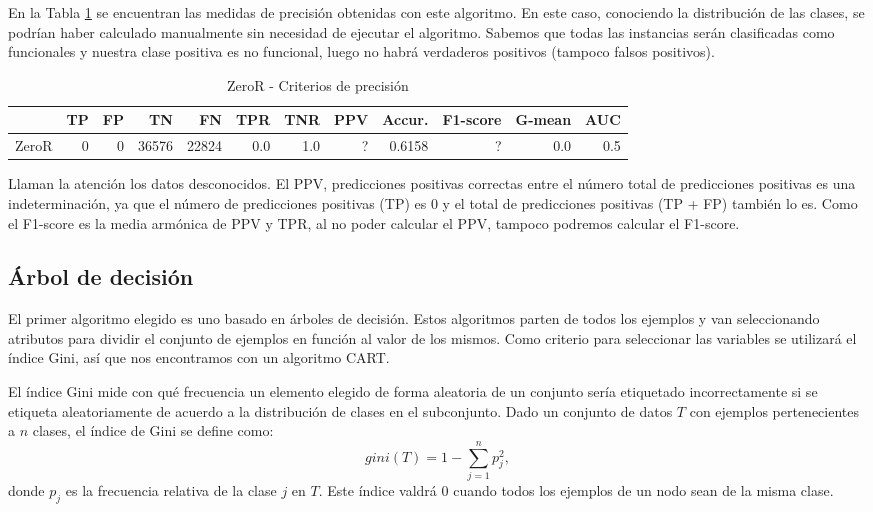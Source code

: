 \documentclass[a4paper, 20pt]{article}
\begin{document}
En la Tabla \ref{tab:zeroR} se encuentran las medidas de precisión obtenidas con este algoritmo. En este caso, conociendo la distribución de las clases, se podrían haber calculado manualmente sin necesidad de ejecutar el algoritmo. Sabemos que todas las instancias serán clasificadas como funcionales y nuestra clase positiva es no funcional, luego no habrá verdaderos positivos (tampoco falsos positivos).

\begin{table}[H]
\centering
\caption{ZeroR - Criterios de precisión}
\label{tab:zeroR}
\begin{tabular}{lrrrrrrrrrrr}
\toprule
 & TP & FP & TN & FN & TPR & TNR & PPV & Accur. & F1-score & G-mean & AUC\\ \midrule
ZeroR & 0 & 0 & 36576 & 22824 & 0.0 & 1.0 & ? & 0.6158 & ? & 0.0 & 0.5\\
\bottomrule
\end{tabular}
\end{table}

Llaman la atención los datos desconocidos. El PPV, predicciones positivas correctas entre el número total de predicciones positivas es una indeterminación, ya que el número de predicciones positivas (TP) es 0 y el total de predicciones positivas (TP + FP) también lo es. Como el F1-score es la media armónica de PPV y TPR, al no poder calcular el PPV, tampoco podremos calcular el F1-score.


\subsection{Árbol de decisión}

El primer algoritmo elegido es uno basado en árboles de decisión. Estos algoritmos parten de todos los ejemplos y van seleccionando atributos para dividir el conjunto de ejemplos en función al valor de los mismos. Como criterio para seleccionar las variables se utilizará el índice Gini, así que nos encontramos con un algoritmo CART.

El índice Gini mide con qué frecuencia un elemento elegido de forma aleatoria de un conjunto sería etiquetado incorrectamente si se etiqueta aleatoriamente de acuerdo a la distribución de clases en el subconjunto. Dado un conjunto de datos $T$ con ejemplos pertenecientes a $n$ clases, el índice de Gini se define como:
\[gini(T) = 1 - \sum_{j=1}^np_j^2,\] donde $p_j$ es la frecuencia relativa de la clase $j$ en $T$. Este índice valdrá 0 cuando todos los ejemplos de un nodo sean de la misma clase.
\end{document}
